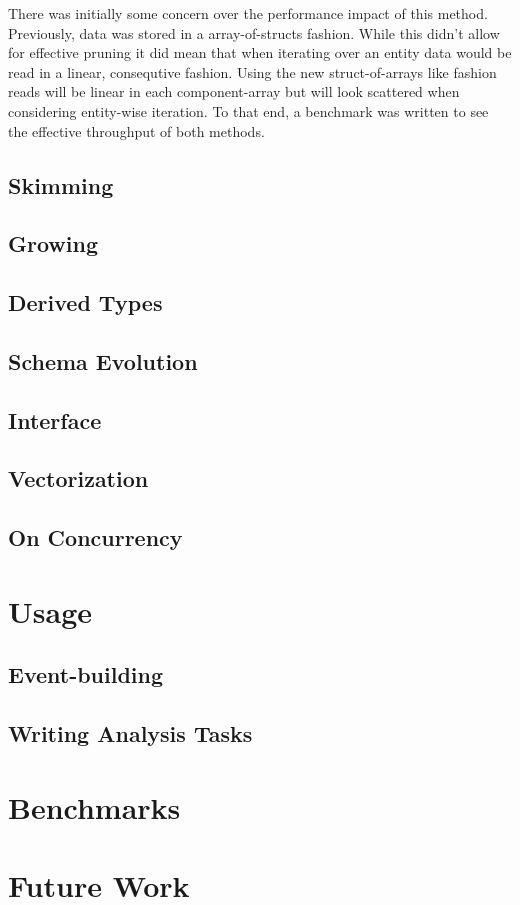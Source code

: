 \documentclass[a4paper]{report}
\begin{document}
 \par There was initially some concern over the performance impact of this method. Previously, data was stored in a array-of-structs fashion. While this didn't allow
 for effective pruning it did mean that when iterating over an entity data would be read in a linear, consequtive fashion. Using the new struct-of-arrays like fashion reads will be
 linear in each component-array but will look scattered when considering entity-wise iteration. To that end, a benchmark was written to see the effective throughput of both methods.


\subsection{Skimming}


\subsection{Growing}

\subsection{Derived Types}

\subsection{Schema Evolution}

\subsection{Interface}

\subsection{Vectorization}


\subsection{On Concurrency}

\newpage
\section{Usage}
\subsection{Event-building}
\subsection{Writing Analysis Tasks}
\newpage

\section{Benchmarks}

\section{Future Work}
\end{document}
